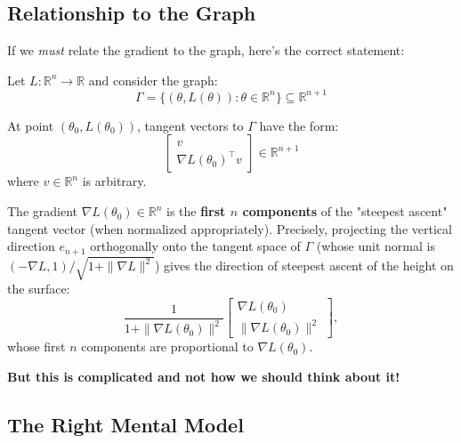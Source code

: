 \begin{notechapter}
\subsection{Relationship to the Graph}

If we \textit{must} relate the gradient to the graph, here's the correct statement:

\begin{theorem}
Let $L : \mathbb{R}^n \to \mathbb{R}$ and consider the graph:
\[
\Gamma = \{(\theta, L(\theta)) : \theta \in \mathbb{R}^n\} \subseteq \mathbb{R}^{n+1}
\]

At point $(\theta_0, L(\theta_0))$, tangent vectors to $\Gamma$ have the form:
\[
\begin{bmatrix} v \\ \nabla L(\theta_0)^\top v \end{bmatrix} \in \mathbb{R}^{n+1}
\]
where $v \in \mathbb{R}^n$ is arbitrary.

The gradient $\nabla L(\theta_0) \in \mathbb{R}^n$ is the \textbf{first $n$ components} of the "steepest ascent" tangent vector (when normalized appropriately). Precisely, projecting the vertical direction $e_{n+1}$ orthogonally onto the tangent space of $\Gamma$ (whose unit normal is $(-\nabla L, 1)/\sqrt{1 + \|\nabla L\|^2}$) gives the direction of steepest ascent of the height on the surface:
\[
\frac{1}{1 + \|\nabla L(\theta_0)\|^2}\begin{bmatrix} \nabla L(\theta_0) \\ \|\nabla L(\theta_0)\|^2 \end{bmatrix},
\]
whose first $n$ components are proportional to $\nabla L(\theta_0)$.
\end{theorem}

\textbf{But this is complicated and not how we should think about it!}

\subsection{The Right Mental Model}

\begin{center}
\end{center}


\end{notechapter}
